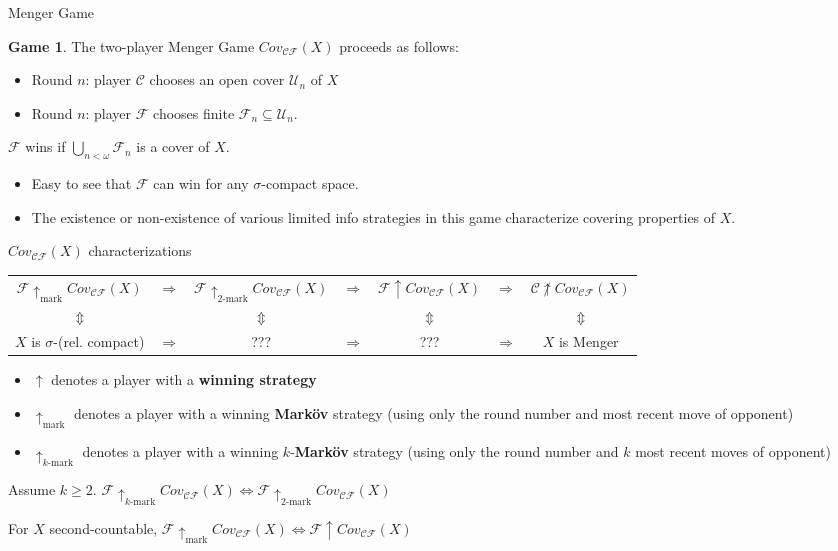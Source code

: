 \documentclass{beamer}
\theoremstyle{theorem}
\theoremstyle{definition}
\newtheorem{game}[theorem]{Game}
\newcommand{\win}{\uparrow}
\newcommand{\markwin}{\uparrow_{\text{mark}}}
\newcommand{\kmarkwin}[1]{\uparrow_{#1\text{-mark}}}
\newcommand{\mengame}[1]{Cov_{\pl C\pl F}(#1)}
\newcommand{\<}{\langle}
\renewcommand{\>}{\rangle}
\newcommand{\pl}[1]{\mathscr{#1}}
\begin{document}
\begin{frame}{Menger Game}
  \begin{game}
    The two-player Menger Game $\mengame{X}$ proceeds as follows:
    \begin{itemize}
      \item Round $n$: player $\pl C$ chooses an open cover $\mathcal{U}_n$ of $X$
      \item Round $n$: player $\pl F$ chooses finite $\mathcal{F}_n\subseteq\mathcal{U}_n$.
    \end{itemize}
    $\pl F$ wins if $\bigcup_{n<\omega} \mathcal{F}_n$ is a cover of $X$.
  \end{game}
  \pause

  \begin{itemize}
  \item Easy to see that $\pl F$ can win for any $\sigma$-compact space.
  \pause
  \item
    The existence or non-existence of various limited info strategies in this game characterize covering properties of $X$.
  \end{itemize}
\end{frame}

\begin{frame}{$\mengame{X}$ characterizations}

{\tiny
  \begin{tabular}{ccccccc}
  $\pl F\markwin\mengame{X}$ & $\Rightarrow$ &
  $\pl F\kmarkwin{2}\mengame{X}$ & $\Rightarrow$ &
  $\pl F\win\mengame{X}$ & $\Rightarrow$ &
  $\pl C\not\win\mengame{X}$ \\
  $\Updownarrow$ &&
  $\Updownarrow$ &&
  $\Updownarrow$ &&
  $\Updownarrow$ \\
  $X$ is $\sigma$-(rel. compact) & $\Rightarrow$ &
  ??? & $\Rightarrow$ &
  ??? & $\Rightarrow$ &
  $X$ is Menger
  \end{tabular}
}
{\small
\begin{itemize}
  \item $\win$ denotes a player with a \textbf{winning strategy}
  \item $\markwin$ denotes a player with a winning \textbf{Mark\"ov} strategy (using only the round number and most recent move of opponent)
  \item $\kmarkwin{k}$ denotes a player with a winning $k$-\textbf{Mark\"ov} strategy (using only the round number and $k$ most recent moves of opponent)
\end{itemize}
}
\pause
\begin{theorem}
Assume $k\geq 2$. $\pl F\kmarkwin{k}\mengame{X} \Leftrightarrow \pl F\kmarkwin{2}\mengame{X}$
\end{theorem}
\begin{theorem}
For $X$ second-countable, $\pl F\markwin\mengame{X} \Leftrightarrow \pl F\win\mengame{X}$
\end{theorem}

\end{frame}
\end{document}
